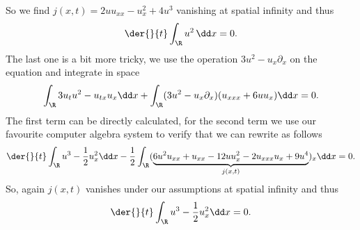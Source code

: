 So we find $j(x,t)=2uu_{xx}-u_x^2 + 4u^3$ vanishing at spatial infinity and thus 
\begin{align}
\der{}{t}\int_\R u^2\, \dd x= 0.
\end{align}
The last one is a bit more tricky, we use the operation $3u^2-u_x\partial_x$ on the equation and integrate in space 
\begin{align}
\int_\R3u_t u^2 - u_{tx}u_x\dd x +\int_\R(3u^2-u_x\partial_x)(u_{xxx} +6uu_x)\dd x =0.
\end{align}
The first term can be directly calculated, for the second term we use our favourite computer algebra system to verify that we can rewrite as follows
\begin{align}
\der{}{t}\int_\R u^3 -\frac 12 u_x^2 \dd x -\frac 12\int_\R(\underbrace{6u^2u_{xx}+u_{xx}-12uu_x^2-2u_{xxx}u_x+9u^4}_{j(x,t)})_x\dd x = 0.
\end{align}
So, again $j(x,t)$ vanishes under our assumptions at spatial infinity and thus
\begin{align}
\der{}{t}\int_\R u^3 -\frac 12 u_x^2 \dd x  = 0.
\end{align}
